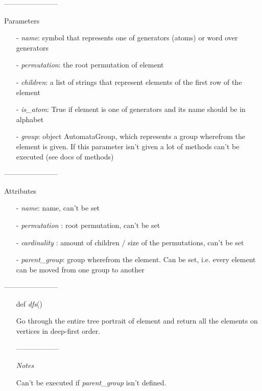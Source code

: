 \documentclass[a4paper,12pt]{amsart}
\begin{document}
\begin{itemize}
	-----------------------
	
	Parameters
	
	\begin{itemize}
		\item[-] \textit{name}: symbol that represents one of generators (atoms) or word over generators
		
		\item[-] \textit{permutation}: the root permutation of element 
		
		\item[-] \textit{children}: a list of strings that represent elements of the first row of the element
		
		\item[-] \textit{is\_atom}: True if element is one of generators and its name should be in alphabet 
		
		\item[-] \textit{group}: object AutomataGroup, which represents a group wherefrom the element is given. If this parameter isn't given a lot of methods can't be executed (see docs of methods)

	\end{itemize}

	-----------------------
	
	Attributes 
	
	\begin{itemize}
		\item[-] \textit{name}: name, can't be set
		\item[-] \textit{permutation} : root permutation, can't be set
		\item[-] \textit{cardinality} : amount of children / size of the permutations, can't be set 
		\item[-] \textit{parent\_group}: group wherefrom the element. Can be set, i.e. every element can be moved from one group to another
	\end{itemize}
	
	
	-----------------------
	
	\begin{itemize}
		\item[def] \textit{dfs}()
		
		Go through the entire tree portrait of element and return all the elements on vertices in deep-first order.
		
		------------------
		
		\textit{Notes}
		
		Can't be executed if \textit{parent\_group} isn't defined.
		

\end{itemize}
\end{itemize}
\end{document}
